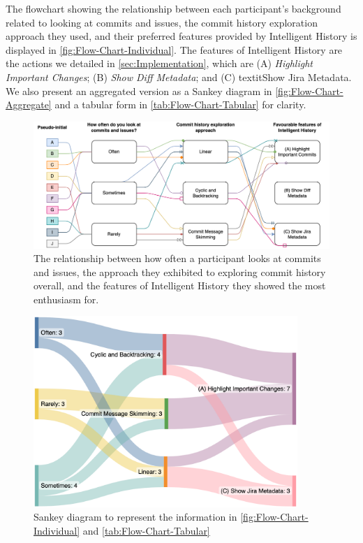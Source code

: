 The flowchart showing the relationship between each participant's background related to looking at commits and issues,
the commit history exploration approach they used, and their preferred features provided by Intelligent History is displayed in \autoref{fig:Flow-Chart-Individual}.
The features of Intelligent History are the actions we detailed in \autoref{sec:Implementation}, which are 
(A) \textit{Highlight Important Changes}; (B) \textit{Show Diff Metadata}; and (C) textit{Show Jira Metadata}.
We also present an aggregated version as a Sankey diagram in \autoref{fig:Flow-Chart-Aggregate} and a tabular form in \autoref{tab:Flow-Chart-Tabular} for clarity.

\begin{figure}[h]
  \centering
  \includegraphics[width=12cm]{./images/flow-chart-ind.png}
  \caption{
    The relationship between how often a participant looks at commits and issues, the approach they exhibited to exploring commit history overall, and the features of Intelligent History they showed the most enthusiasm for.
  }
  \label{fig:Flow-Chart-Individual}
\end{figure}

\begin{figure}[h]
  \centering
  \includegraphics[width=10cm]{./images/flow-chart-aggr.png}
  \caption{
    Sankey diagram to represent the information in \autoref{fig:Flow-Chart-Individual} and \autoref{tab:Flow-Chart-Tabular}
  }
  \label{fig:Flow-Chart-Aggregate}
\end{figure}

